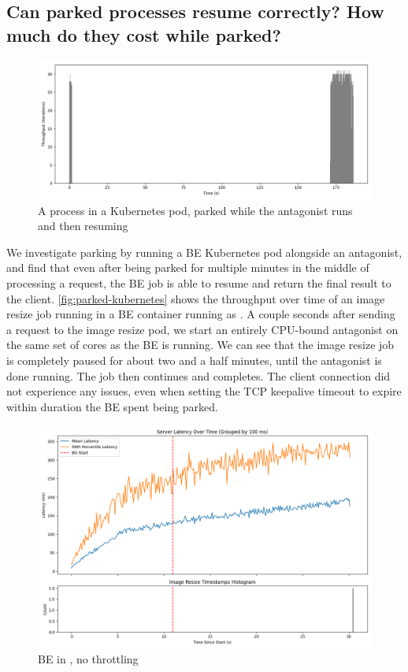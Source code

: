 \subsection{Can parked processes resume correctly? How much do they cost while
parked?}\label{ss:eval:parking}


\begin{figure}[t]
    \centering
    \includegraphics[width=\columnwidth]{graphs/parked-kubernetes.png}
    \caption{A \beclass{} process in a Kubernetes pod, parked while the
    antagonist runs and then resuming}\label{fig:parked-kubernetes}
\end{figure}

We investigate parking by running a BE Kubernetes pod alongside an antagonist,
and find that even after being parked for multiple minutes in the middle of
processing a request, the BE job is able to resume and return the final result
to the client. \autoref{fig:parked-kubernetes} shows the throughput over time of
an image resize job running in a BE container running as \schedbe{}. A couple
seconds after sending a request to the image resize pod, we start an entirely
CPU-bound antagonist on the same set of cores as the BE is running. We can see
that the image resize job is completely paused for about two and a half minutes,
until the antagonist is done running. The job then continues and completes. The
client connection did not experience any issues, even when setting the TCP
keepalive timeout to expire within duration the BE spent being parked.

\begin{figure}[t]
    \centering
    \includegraphics[width=\columnwidth]{graphs/overload-schedbe.png}
    \caption{BE in \schedbe{}, no throttling}\label{fig:overload-schedbe}
\end{figure}

